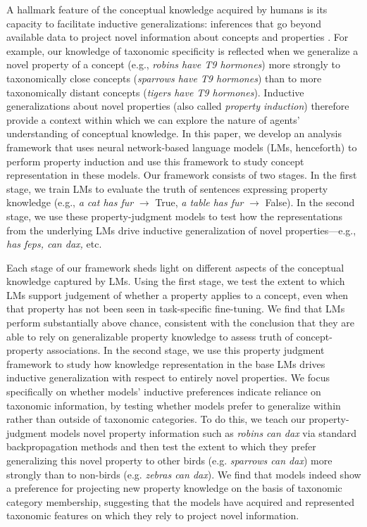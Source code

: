 \documentclass[10pt,letterpaper]{article}
\newcommand{\todo}[1]{\textcolor{purple}{$_{todo}$[#1]}}
\begin{document}
A hallmark feature of the conceptual knowledge acquired by humans is its capacity to facilitate inductive generalizations: inferences that go beyond available data to project novel information about concepts and properties \citep{osherson1990category, chater2011inductive, hayes2018inductive}.
For example, our knowledge of taxonomic specificity is reflected when we generalize a novel property of a concept (e.g., \textit{robins have T9 hormones}) more strongly to taxonomically close concepts (\textit{sparrows have T9 hormones}) than to more taxonomically distant concepts (\textit{tigers have T9 hormones}).
Inductive generalizations about novel properties (also called \textit{property induction}) therefore provide a context within which we can explore the nature of agents' understanding of conceptual knowledge.
In this paper, we develop an analysis framework that uses neural network-based language models (LMs, henceforth) to perform property induction and use this framework to study concept representation in these models.
Our framework consists of two stages. 
In the first stage, we train LMs to evaluate the truth of sentences expressing property knowledge (e.g., \textit{a cat has fur} $\rightarrow$ True, \textit{a table has fur} $\rightarrow$ False). 
In the second stage, we use these property-judgment models to test how the representations from the underlying LMs drive inductive generalization of novel properties---e.g., \textit{has feps, can dax,} etc.

Each stage of our framework sheds light on different aspects of the conceptual knowledge captured by LMs.
Using the first stage, we test the extent to which LMs support judgement of whether a property applies to a concept, even when that property has not been seen in task-specific fine-tuning. 
We find that LMs perform substantially above chance, consistent with the conclusion that they are able to rely on generalizable property knowledge to assess truth of concept-property associations.
In the second stage, we use this property judgment framework to study how knowledge representation in the base LMs drives inductive generalization with respect to entirely novel properties. 
We focus specifically on whether models' inductive preferences indicate reliance on taxonomic information, by testing whether models prefer to generalize within rather than outside of taxonomic categories. 
To do this, we teach our property-judgment models novel property information such as \textit{robins can dax} via standard backpropagation methods and then test the extent to which they prefer generalizing this novel property to other birds (e.g. \textit{sparrows can dax}) more strongly than to non-birds (e.g. \textit{zebras can dax}).
We find that models indeed show a preference for projecting new property knowledge on the basis of taxonomic category membership, suggesting that the models have acquired and represented taxonomic features on which they rely to project novel information.
\end{document}
